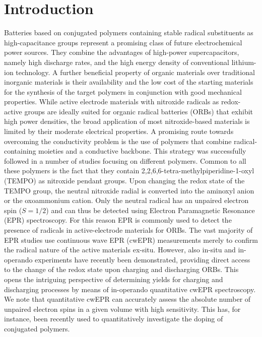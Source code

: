 \documentclass{WileyMSP-template}
\begin{document}
\section{Introduction}
Batteries based on conjugated polymers containing stable radical substituents as high-capacitance groups represent a promising class of future electrochemical power sources.\cite{nakahara2002_cpl, nishide2004_electact,xie2021_mathoriz} They combine the advantages of high-power supercapacitors, namely high discharge rates, and the high energy density of conventional lithium-ion technology. A further beneficial property of organic materials over traditional inorganic materials is their availability and the low cost of the starting materials for the synthesis of the target polymers in conjunction with good mechanical properties.\cite{janoschka2012_advmater, muench2016_chemrev, friebe2017_topcurrchem}
\bigbreak
While active electrode materials with nitroxide radicals as redox-active groups are ideally suited for organic radical batteries (ORBs) that exhibit high power densities, the broad application of most nitroxide-based materials is limited by their moderate electrical properties. A promising route towards overcoming the conductivity problem is the use of polymers that combine radical-containing moieties and a conductive backbone. This strategy was successfully followed in a number of studies focusing on different polymers.\cite{oyaizu2015_polymerjournal, bahaceci2013_jpowersources, katsumata2006_mrc, xu2014_electact, aydin2015_jsoistatelect, schwartz2018_synthmet} 
\bigbreak
Common to all these polymers is the fact that they contain 2,2,6,6-tetra-methylpiperidine-1-oxyl (TEMPO) as nitroxide pendant groups. Upon changing the redox state of the TEMPO group, the neutral nitroxide radial is converted into the aminoxyl anion or the oxoammonium cation. Only the neutral radical has an unpaired electron spin ($S = 1/2$) and can thus be detected using Electron Paramagnetic Resonance (EPR) spectroscopy. For this reason EPR is commonly used to detect the presence of radicals in active-electrode materials for ORBs.\cite{nakahara2002_cpl, nishide2004_electact, bahaceci2013_jpowersources, aydin2015_jsoistatelect, khodeir2019_softmatter} The vast majority of EPR studies use continuous wave EPR (cwEPR) measurements merely to confirm the radical nature of the active materials ex-situ. However, also in-situ and in-operando experiments have recently been demonstrated, providing direct access to the change of the redox state upon charging and discharging ORBs.\cite{huang2016_jpowersources, kanzaki2018_acsappmat} This opens the intriguing perspective of determining yields for charging and discharging processes by means of in-operando quantitative cwEPR spectroscopy. We note that quantitative cwEPR can accurately assess the absolute number of unpaired electron spins in a given volume with high sensitivity. This has, for instance, been recently used to quantitatively investigate the doping of conjugated polymers.\cite{arvind2020_jpcb, pingel2016_aem}
\end{document}
